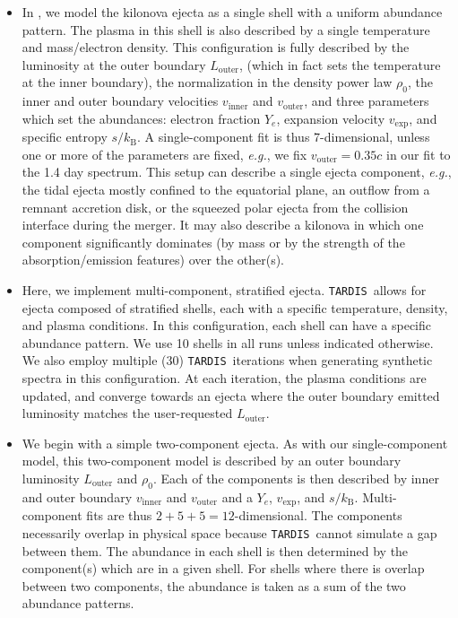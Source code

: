 \documentclass[twocolumn, twocolappendix]{aastex63}
\def\TARDIS{\texttt{TARDIS}}
\def\eg{{\it e.g.}}
\begin{document}
\begin{itemize}

    \item In \cite{vieira23}, we model the kilonova ejecta as a single shell with a uniform abundance pattern. The plasma in this shell is also described by a single temperature and mass/electron density. This configuration is fully described by the luminosity at the outer boundary $L_{\mathrm{outer}}$, (which in fact sets the temperature at the inner boundary), the normalization in the density power law $\rho_0$, the inner and outer boundary velocities $v_{\mathrm{inner}}$ and $v_{\mathrm{outer}}$, and three parameters which set the abundances: electron fraction $Y_e$, expansion velocity $v_{\mathrm{exp}}$, and specific entropy $s / k_{\mathrm{B}}$. A single-component fit is thus 7-dimensional, unless one or more of the parameters are fixed, \eg, we fix $v_{\mathrm{outer}} = 0.35c$ in our fit to the 1.4 day spectrum. This setup can describe a single ejecta component, \eg, the tidal ejecta mostly confined to the equatorial plane, an outflow from a remnant accretion disk, or the squeezed polar ejecta from the collision interface during the merger. It may also describe a kilonova in which one component significantly dominates (by mass or by the strength of the absorption/emission features) over the other(s). 
    
    \item Here, we implement multi-component, stratified ejecta. \TARDIS~allows for ejecta composed of stratified shells, each with a specific temperature, density, and plasma conditions. In this configuration, each shell can have a specific abundance pattern. We use 10 shells in all runs unless indicated otherwise. We also employ multiple (30) \TARDIS~iterations when generating synthetic spectra in this configuration. At each iteration, the plasma conditions are updated, and converge towards an ejecta where the outer boundary emitted luminosity matches the user-requested $L_{\mathrm{outer}}$. 
    
    \item We begin with a simple two-component ejecta. As with our single-component model, this two-component model is described by an outer boundary luminosity $L_{\mathrm{outer}}$ and $\rho_0$. Each of the components is then described by inner and outer boundary $v_{\mathrm{inner}}$ and $v_{\mathrm{outer}}$ and a $Y_e$, $v_{\mathrm{exp}}$, and $s / k_{\mathrm{B}}$. Multi-component fits are thus $2 + 5 + 5 = 12$-dimensional. The components necessarily overlap in physical space because \TARDIS~cannot simulate a gap between them. The abundance in each shell is then determined by the component(s) which are in a given shell. For shells where there is overlap between two components, the abundance is taken as a sum of the two abundance patterns.
    

\end{itemize}
\end{document}
